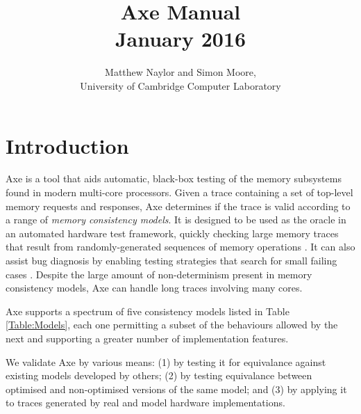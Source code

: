 \documentclass[11pt]{article}
\begin{document}
\title{\textbf{Axe Manual}\\ {\large January 2016}}
\author{Matthew Naylor and Simon Moore, \\
University of Cambridge Computer Laboratory}
\date{}
\maketitle

\tableofcontents

\newpage

\setlength{\parskip}{1em}
\renewcommand{\thefootnote}{\fnsymbol{footnote}}

\newcommand{\cmark}{\ding{51}}
\newcommand{\xmark}{\ding{55}}

\section{Introduction}

Axe is a tool that aids automatic, black-box testing of the
memory subsystems found in modern multi-core processors.  Given a
trace containing a set of top-level memory requests and responses, Axe
determines if the trace is valid according to a range of \emph{memory
consistency models}.  It is designed to be used as the oracle in an
automated hardware test framework, quickly checking large memory
traces that result from randomly-generated sequences of memory
operations \cite{BlueCheck}.
It can also assist bug diagnosis by enabling
testing strategies that search
for small failing cases \cite{BlueCheck}.
Despite
the large amount of non-determinism present in memory consistency
models, Axe can handle long traces involving many cores.

Axe supports a spectrum of five consistency models listed in Table
\ref{Table:Models}, each one permitting a subset of the behaviours
allowed by the next and supporting a greater number of implementation
features.

We validate Axe by various means: (1) by testing it for equivalance
against existing models developed by others; (2) by testing
equivalance between optimised and non-optimised versions of the same
model; and (3) by applying it to traces generated by real and model
hardware implementations.
\end{document}
